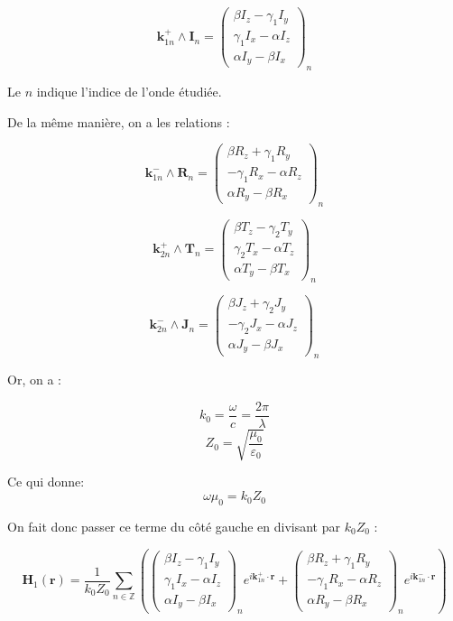 \documentclass{article}
\begin{document}
\[
\mathbf{k}_{1n}^{+} \wedge \mathbf{I}_n =
\begin{pmatrix}
\beta I_{z} - \gamma_1 I_{y} \\
\gamma_1 I_{x} - \alpha I_{z} \\
\alpha I_{y} - \beta I_{x}
\end{pmatrix}_n
\]

Le \( n \) indique l'indice de l'onde étudiée.

De la même manière, on a les relations :

\[
\mathbf{k}_{1n}^{-} \wedge \mathbf{R}_n =
\begin{pmatrix}
\beta R_{z} + \gamma_1 R_{y} \\
- \gamma_1 R_{x} - \alpha R_{z} \\
\alpha R_{y} - \beta R_{x}
\end{pmatrix}_n
\]

\[
\mathbf{k}_{2n}^{+} \wedge \mathbf{T}_n =
\begin{pmatrix}
\beta T_{z} - \gamma_2 T_{y} \\
\gamma_2 T_{x} - \alpha T_{z} \\
\alpha T_{y} - \beta T_{x}
\end{pmatrix}_n
\]

\[
\mathbf{k}_{2n}^{-} \wedge \mathbf{J}_n =
\begin{pmatrix}
\beta J_{z} + \gamma_2 J_{y} \\
- \gamma_2 J_{x} - \alpha J_{z} \\
\alpha J_{y} - \beta J_{x}
\end{pmatrix}_n
\]

Or, on a :

\[
k_0 = \frac{\omega}{c} = \frac{2\pi}{\lambda}
\]
\[
Z_0 = \sqrt{\frac{\mu_0}{\varepsilon_0}} 
\]

Ce qui donne: 
\[
\omega \mu_0 = k_0 Z_0
\]

On fait donc passer ce terme du côté gauche en divisant par \( k_0 Z_0 \) :

\[
\mathbf{H}_1(\mathbf{r}) = \frac{1}{k_0 Z_0} \sum_{n \in \mathbb{Z}} 
\left(
\begin{pmatrix}
\beta I_{z} - \gamma_1 I_{y} \\
\gamma_1 I_{x} - \alpha I_{z} \\
\alpha I_{y} - \beta I_{x}
\end{pmatrix}_n
e^{i \mathbf{k}_{1n}^{+} \cdot \mathbf{r}} +
\begin{pmatrix}
\beta R_{z} + \gamma_1 R_{y} \\
- \gamma_1 R_{x} - \alpha R_{z} \\
\alpha R_{y} - \beta R_{x}
\end{pmatrix}_n
e^{i \mathbf{k}_{1n}^{-} \cdot \mathbf{r}}
\right)
\]
\end{document}
